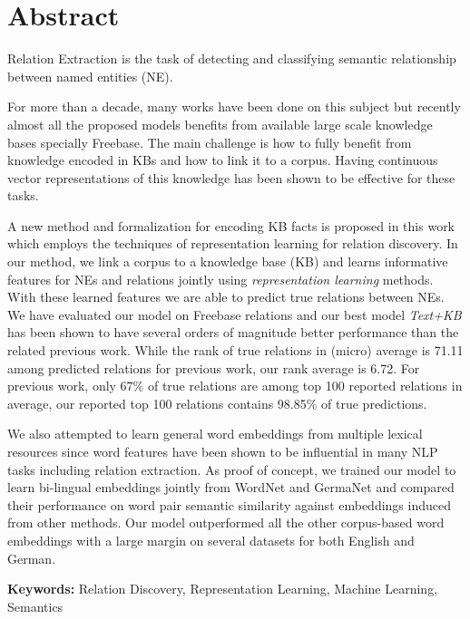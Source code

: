\chapter*{Abstract}

Relation Extraction is the task of detecting and classifying semantic relationship 
between named entities (NE).

For more than a decade, many works have been done on this subject but recently
almost all the proposed models benefits from available large scale knowledge
bases specially Freebase. The main challenge is how to fully benefit from
knowledge encoded in KBs and how to link it to a corpus. Having continuous
vector representations of this knowledge has been shown to be effective for
these tasks.

A new method and formalization for encoding KB facts is proposed in this
work which employs the techniques of representation learning for relation discovery.
 In our method, we link a corpus to a knowledge base (KB)
and learns informative features for NEs and relations jointly using
\emph{representation learning} methods. With these learned features
we are able to predict true relations between NEs. We have evaluated
our model on Freebase relations and our best model \emph{Text+KB} has been shown to have  several orders of magnitude better performance than the related previous work. While the rank of true relations in (micro) average is 71.11 among predicted relations for
previous work, our rank average is 6.72. For previous work, only 67\% of
true relations are among top 100 reported relations in average, our reported top
100 relations contains 98.85\% of true predictions.

We also attempted to learn
general word embeddings from multiple lexical resources since word features
have been shown to be influential in many NLP tasks including relation
extraction. As proof of concept, we trained our model to learn bi-lingual
embeddings jointly from WordNet and GermaNet and compared their performance on word pair semantic similarity
against embeddings induced from other methods. Our model outperformed all the
other corpus-based word embeddings  with a large margin on several datasets for
both English and German.

\vspace{1cm}

\textbf{Keywords:} Relation Discovery, Representation Learning, Machine
Learning, Semantics
